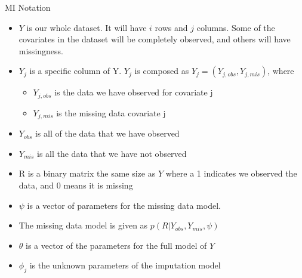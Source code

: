 \begin{frame}{MI Notation}
 
 \begin{itemize}
\item $Y$ is our whole dataset. It will have $i$ rows and $j$ columns. Some of the covariates in the dataset will be completely observed, and others will have missingness.
\item $Y_j$ is a specific column of Y. $Y_j$ is composed as $Y_j=(Y_{j,obs},Y_{j,mis})$, where
	\begin{itemize}
	\item $Y_{j,obs}$ is the data we have observed for covariate j
	\item $Y_{j,mis}$ is the missing data covariate j
\end{itemize} 
\item $Y_{obs}$ is all of the data that we have observed
\item $Y_{mis}$ is all the data that we have not observed
\item R is a binary matrix the same size as $Y$ where a 1 indicates we observed the data, and 0 means it is missing
\item $\psi$ is a vector of parameters for the missing data model. 
\item The missing data model is given as $p(R|Y_{obs},Y_{mis},\psi)$
\item $\theta$ is a vector of the parameters for the full model of $Y$
\item $\phi_j$ is the unknown parameters of the imputation model 
\end{itemize}
\end{frame}

